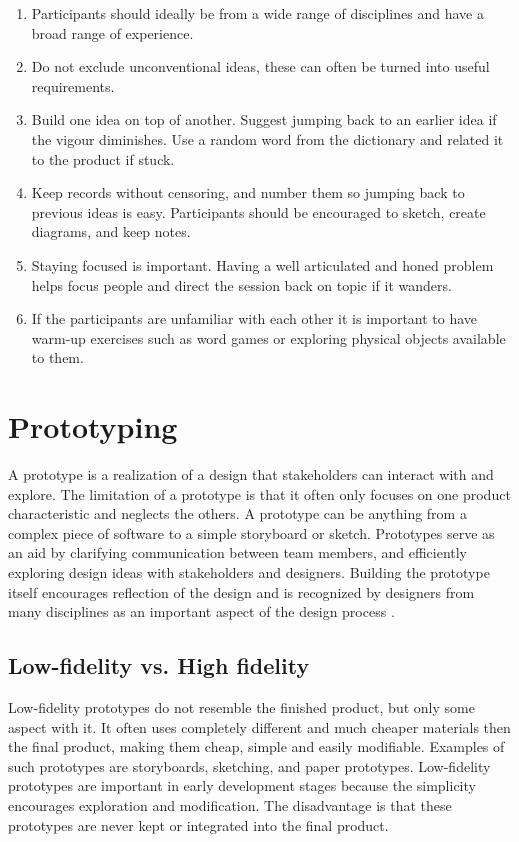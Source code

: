 \begin{enumerate}[itemsep=3pt, parsep=0cm]
  \item Participants should ideally be from a wide range of disciplines and have a broad range of experience.
  \item Do not exclude unconventional ideas, these can often be turned into useful requirements.
  \item Build one idea on top of another. Suggest jumping back to an earlier idea if the vigour diminishes. Use a random word from the dictionary and related it to the product if stuck.
  \item Keep records without censoring, and number them so jumping back to previous ideas is easy. Participants should be encouraged to sketch, create diagrams, and keep notes.
  \item Staying focused is important. Having a well articulated and honed problem helps focus people and direct the session back on topic if it wanders.
  \item If the participants are unfamiliar with each other it is important to have warm-up exercises such as word games or exploring physical objects available to them.
\end{enumerate}

\section{Prototyping}
A prototype is a realization of a design that stakeholders can interact with and explore. The limitation of a prototype is that it often only focuses on one product characteristic and neglects the others. A prototype can be anything from a complex piece of software to a simple storyboard or sketch. Prototypes serve as an aid by clarifying communication between team members, and efficiently exploring design ideas with stakeholders and designers. Building the prototype itself encourages reflection of the design and is recognized by designers from many disciplines as an important aspect of the design process \cite{interactionDesign}.

\subsection{Low-fidelity vs. High fidelity}
Low-fidelity prototypes do not resemble the finished product, but only some aspect with it. It often uses completely different and much cheaper materials then the final product, making them cheap, simple and easily modifiable. Examples of such prototypes are storyboards, sketching, and paper prototypes. Low-fidelity prototypes are important in early development stages because the simplicity encourages exploration and modification. The disadvantage is that these prototypes are never kept or integrated into the final product.

